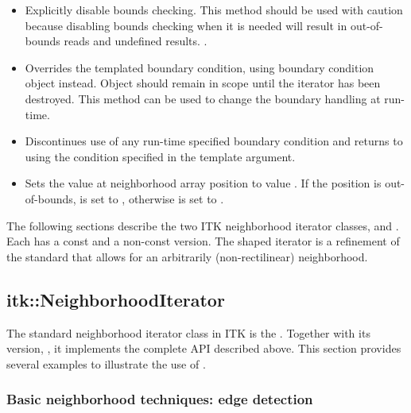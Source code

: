 {\begin{itemize}
\item \textbf{} Explicitly disable
bounds checking. This method should be used with caution because disabling
bounds checking when it is needed will result in out-of-bounds reads and
undefined results.
.
\item \textbf{} 
Overrides the templated boundary condition, using boundary condition object
 instead. Object  should remain in scope until the iterator has
been destroyed.  This method can be used to change the boundary handling at
run-time.

\item \textbf{} Discontinues use of any
run-time specified boundary condition and returns to using the condition
specified in the template argument.

\item \textbf{} Sets the value at neighborhood array position  to value
.  If the position  is out-of-bounds,  is set to
, otherwise  is set to .
\end{itemize}


The following sections describe the two ITK neighborhood iterator classes,
 and .
Each has a const and a non-const version.  The shaped iterator is a refinement
of the standard  that allows for an arbitrarily
(non-rectilinear) neighborhood.

\subsection{itk::NeighborhoodIterator}
\label{sec:itkNeighborhoodIterator}
The standard neighborhood iterator class in ITK is the
.  Together with its  version,
, it implements the complete API
described above.  This section provides several examples to illustrate the use
of .

\subsubsection{Basic neighborhood techniques: edge detection}
\label{sec:NeighborhoodExample1}


}
